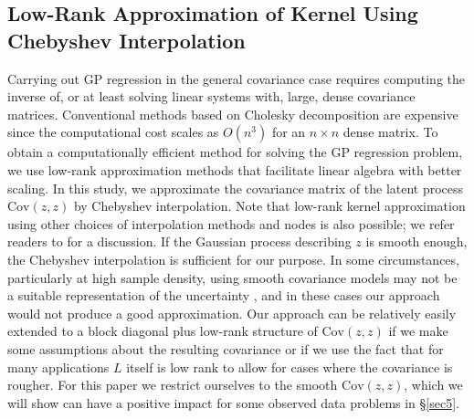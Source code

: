 \documentclass[article,ij4uq]{ij4uq}              %
\begin{document}
\subsection{Low-Rank Approximation of Kernel Using Chebyshev Interpolation}\label{sec:lra}
\par Carrying out GP regression in the general covariance case requires computing the inverse of, or at least solving linear systems with, large, dense covariance matrices. Conventional methods based on Cholesky decomposition are expensive since the computational cost scales as $O(n^{3})$ for an $n\times n$ dense matrix.  To obtain a computationally efficient method for solving the GP regression problem, we use low-rank approximation methods that facilitate linear algebra with better scaling. In this study, we approximate the covariance matrix of the latent process $\mathrm{Cov}(z,z)$ by Chebyshev interpolation. Note that low-rank kernel approximation using other choices of interpolation methods and nodes is also possible; we refer readers to \cite{LowRankInterp} for a discussion. If the Gaussian process describing $z$ is smooth enough, the Chebyshev interpolation is sufficient for our purpose. In some circumstances, particularly at high sample density, using smooth covariance models may not be a suitable representation of the uncertainty \cite{SteinKriging}, and in these cases our approach would not produce a good approximation. Our approach can be relatively easily extended to a block diagonal plus low-rank structure of $\mathrm{Cov}(z,z)$ if we make some assumptions about the resulting covariance or if we use the fact that for many applications $L$ itself is low rank \cite{alexanderian2014optimal} to allow for cases where the covariance is rougher. For this paper we restrict ourselves to the smooth $\mathrm{Cov}(z,z)$, which we will show can have a positive impact for some observed data problems in \S \ref{sec5}.
 
\end{document}
